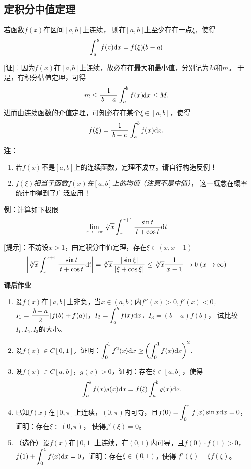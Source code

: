 \subsection{定积分中值定理}

\begin{thx}
	若函数$f(x)$在区间$[a,b]$上连续，
	则在$[a,b]$上至少存在一点$\xi$，使得
	$$\displaystyle\int_a^bf(x)\mathrm{d} x=f(\xi)(b-a)$$
\end{thx}

[证]：因为$f(x)$在$[a,b]$上连续，故必存在最大和最小值，分别记为$M$和$m$。
于是，有积分估值定理，可得
$$m\leq\displaystyle\frac{\,{1}\,}{\,{b-a}\,}\displaystyle\int_a^bf(x)\mathrm{d} x\leq M,$$
进而由连续函数的介值定理，可知必存在某个$\xi\in[a,b]$，使得
$$f(\xi)=\displaystyle\frac{\,{1}\,}{\,{b-a}\,}\displaystyle\int_a^bf(x)\mathrm{d} x.$$
\fin

{\bf 注：}
\begin{enumerate}[(1)]
  \setlength{\itemindent}{1cm}
  \item 若$f(x)$不是$[a,b]$上的连续函数，定理不成立。请自行构造反例！
  \item  {\it\b $f(\xi)$相当于函数$f(x)$在$[a,b]$上的均值（注意不是中值）}，
  这一概念在概率统计中得到了广泛应用！
\end{enumerate}

{\bf 例：}计算如下极限
$$\lim\limits_{x\to{+\infty}}\sqrt[3]x\displaystyle\int_x^{x+1}\displaystyle\frac{\,{\sin t}\,}{\,{t+\cos t}\,}\mathrm{d} t$$

[提示]：不妨设$x>1$，由定积分中值定理，存在$\xi\in(x,x+1)$
$$\left|\sqrt[3]x\displaystyle\int_x^{x+1}\displaystyle\frac{\,{\sin t}\,}{\,{t+\cos t}\,}\mathrm{d} t\right|
=\sqrt[3]x\displaystyle\frac{\,{|\sin\xi|}\,}{\,{|\xi+\cos\xi|}\,}\leq\sqrt[3]x\displaystyle\frac{\,{1}\,}{\,{x-1}\,}
\to0\;(x\to\infty)$$

\begin{ext}
	{\bf 课后作业}
	
	\begin{enumerate}
	  \item 设$f(x)$在$[a,b]$上非负，当$x\in(a,b)$内$f''(x)>0,f'(x)<0$，
		$I_1=\displaystyle\frac{\,{b-a}\,}{\,{2}\,}[f(b)+f(a)]$，$I_2=\displaystyle\int_a^bf(x)\mathrm{d} x$，$I_3=(b-a)f(b)$，
		试比较$I_1,I_2,I_3$的大小。
	  \item 设$f(x)\in C[0,1]$，证明：$\displaystyle\int_0^1f^2(x)\mathrm{d} x\geq
	  \left(\displaystyle\int_0^1f(x)\mathrm{d} x\right)^2$.
	  \item 设$f(x)\in C[a,b]$，$g(x)>0$，证明：存在$\xi\in[a,b]$，使得
	  $$\displaystyle\int_a^bf(x)g(x)\mathrm{d} x=f(\xi)\displaystyle\int_a^bg(x)\mathrm{d} x.$$
	  \item 已知$f(x)$在$[0,\pi]$上连续，$(0,\pi)$内可导，且$f(0)=
	  \displaystyle\int_0^{\pi}f(x)\sin x\mathrm{d} x=0$，证明：存在$\xi\in(0,\pi)$，
	  使得$f'(\xi)=0$。
	  \item （选作）设$f(x)$在$[0,1]$上连续，在$(0,1)$内可导，且$f(0)\cdot f(1)>0$，
	  $f(1)+\displaystyle\int_0^1f(x)\mathrm{d} x=0$，证明：存在$\xi\in(0,1)$，使得
	  $f'(\xi)=\xi f(\xi)$。
	\end{enumerate}
\end{ext}

